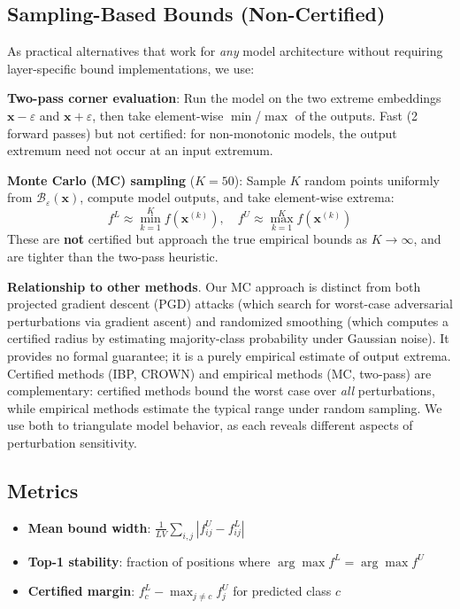 \documentclass[11pt]{article}
\begin{document}
\subsection{Sampling-Based Bounds (Non-Certified)}

As practical alternatives that work for \emph{any} model architecture without requiring layer-specific bound implementations, we use:

\textbf{Two-pass corner evaluation}: Run the model on the two extreme embeddings $\mathbf{x} - \varepsilon$ and $\mathbf{x} + \varepsilon$, then take element-wise $\min$/$\max$ of the outputs. Fast (2 forward passes) but not certified: for non-monotonic models, the output extremum need not occur at an input extremum.

\textbf{Monte Carlo (MC) sampling} ($K{=}50$): Sample $K$ random points uniformly from $\mathcal{B}_\varepsilon(\mathbf{x})$, compute model outputs, and take element-wise extrema:
\begin{equation}
f^L \approx \min_{k=1}^K f(\mathbf{x}^{(k)}), \quad f^U \approx \max_{k=1}^K f(\mathbf{x}^{(k)})
\end{equation}
These are \textbf{not} certified but approach the true empirical bounds as $K \to \infty$, and are tighter than the two-pass heuristic.

\textbf{Relationship to other methods}. Our MC approach is distinct from both projected gradient descent (PGD) attacks (which search for worst-case adversarial perturbations via gradient ascent) and randomized smoothing (which computes a certified radius by estimating majority-class probability under Gaussian noise). It provides no formal guarantee; it is a purely empirical estimate of output extrema. Certified methods (IBP, CROWN) and empirical methods (MC, two-pass) are complementary: certified methods bound the worst case over \emph{all} perturbations, while empirical methods estimate the typical range under random sampling. We use both to triangulate model behavior, as each reveals different aspects of perturbation sensitivity.

\subsection{Metrics}

\begin{itemize}[nosep]
    \item \textbf{Mean bound width}: $\frac{1}{LV}\sum_{i,j} |f^U_{ij} - f^L_{ij}|$
    \item \textbf{Top-1 stability}: fraction of positions where $\arg\max f^L = \arg\max f^U$
    \item \textbf{Certified margin}: $f^L_c - \max_{j \neq c} f^U_j$ for predicted class $c$
\end{itemize}
\end{document}
